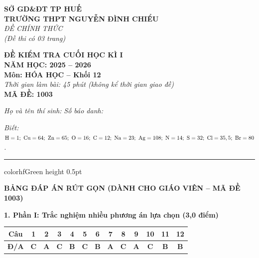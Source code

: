 \documentclass[11pt,a4paper]{article}
\begin{document}
\begin{minipage}[t]{0.48\textwidth}
\textbf{SỞ GD\&ĐT TP HUẾ}\\
\textbf{TRƯỜNG THPT NGUYỄN ĐÌNH CHIỂU}\\
\textit{ĐỀ CHÍNH THỨC}\\
\textit{(Đề thi có 03 trang)}
\end{minipage}
\hfill
\begin{minipage}[t]{0.48\textwidth}
\raggedleft
\textbf{\color{hfRed}ĐỀ KIỂM TRA CUỐI HỌC KÌ I}\\
\textbf{NĂM HỌC: 2025 -- 2026}\\
\textbf{Môn: HÓA HỌC -- Khối 12}\\
\textit{Thời gian làm bài: 45 phút (không kể thời gian giao đề)}\\
\textbf{MÃ ĐỀ: 1003}
\end{minipage}

\vspace{4pt}
\noindent
\textit{Họ và tên thí sinh:} \dotfill \textit{Số báo danh:} \dotfill

\vspace{3pt}
\noindent
\textit{\footnotesize Biết: $\ce{H}=1;\ \ce{Cu}=64;\ \ce{Zn}=65;\ \ce{O}=16;\ \ce{C}=12;\ \ce{Na}=23;\ \ce{Ag}=108;\ \ce{N}=14;\ \ce{S}=32;\ \ce{Cl}=35,5;\ \ce{Br}=80$.}

\vspace{3pt}
\hrule color{hfGreen} height 0.5pt

\vspace{6pt}
\begin{center}
{\Large\textbf{\color{hfRed}BẢNG ĐÁP ÁN RÚT GỌN (DÀNH CHO GIÁO VIÊN -- MÃ ĐỀ 1003)}}
\end{center}

\vspace{2pt}
\noindent
\textbf{\color{mainGreen}1. Phần I: Trắc nghiệm nhiều phương án lựa chọn (3,0 điểm)}
\begin{center}
\renewcommand{\arraystretch}{1.2}
\begin{tabular}{|c|c|c|c|c|c|c|c|c|c|c|c|c|}
\hline
\rowcolor{tableGreen}
\textbf{Câu} & \textbf{1} & \textbf{2} & \textbf{3} & \textbf{4} & \textbf{5} & \textbf{6} & \textbf{7} & \textbf{8} & \textbf{9} & \textbf{10} & \textbf{11} & \textbf{12} \\
\hline
\textbf{Đ/A} & \textbf{\color{hfRed}C} & \textbf{\color{hfRed}A} & \textbf{\color{hfRed}C} & \textbf{\color{hfRed}B} & \textbf{\color{hfRed}C} & \textbf{\color{hfRed}B} & \textbf{\color{hfRed}A} & \textbf{\color{hfRed}C} & \textbf{\color{hfRed}A} & \textbf{\color{hfRed}C} & \textbf{\color{hfRed}B} & \textbf{\color{hfRed}B} \\
\hline
\end{tabular}
\end{center}
\end{document}
